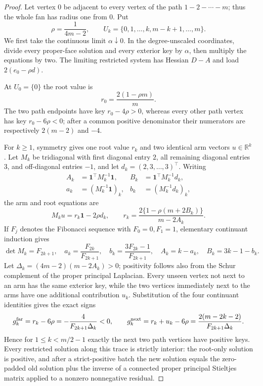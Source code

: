\begin{proof}
Let vertex $0$ be adjacent to every vertex of the path
$1-2-\cdots-m$; thus the whole fan has radius one from $0$.  Put
\begin{equation*}
 \rho=\frac1{4m-2},\qquad
 U_k=\{0,1,\ldots,k,m-k+1,\ldots,m\}.
\end{equation*}
We first take the continuous limit $\alpha\downarrow0$.  In the
degree-unscaled coordinates, divide every proper-face solution and every
exterior key by $\alpha$, then multiply the equations by two.  The limiting
restricted system has Hessian $D-A$ and load $2(e_0-\rho d)$.

At $U_0=\{0\}$ the root value is
\begin{equation*}
 r_0=\frac{2(1-\rho m)}m.
\end{equation*}
The two path endpoints have key $r_0-4\rho>0$, whereas every other
path vertex has key $r_0-6\rho<0$; after a common positive denominator their
numerators are respectively $2(m-2)$ and $-4$.

For $k\geq1$, symmetry gives one root value $r_k$ and two identical arm
vectors $u\in\mathbb R^k$.  Let $M_k$ be tridiagonal with first diagonal
entry $2$, all remaining diagonal entries $3$, and off-diagonal entries
$-1$, and let $d_k=(2,3,\ldots,3)^\top$.  Writing
\begin{align*}
 A_k&=\mathbf1^\top M_k^{-1}\mathbf1,&
 B_k&=\mathbf1^\top M_k^{-1}d_k,\\
 a_k&=(M_k^{-1}\mathbf1)_k,&
 b_k&=(M_k^{-1}d_k)_k,
\end{align*}
the arm and root equations are
\begin{equation*}
 M_ku=r_k\mathbf1-2\rho d_k,\qquad
 r_k=\frac{2\{1-\rho(m+2B_k)\}}{m-2A_k}.
\end{equation*}
If $F_j$ denotes the Fibonacci sequence with $F_0=0,F_1=1$, elementary
continuant induction gives
\begin{equation*}
 \det M_k=F_{2k+1},\quad
 a_k=\frac{F_{2k}}{F_{2k+1}},\quad
 b_k=\frac{3F_{2k}-1}{F_{2k+1}},\quad
 A_k=k-a_k,\quad B_k=3k-1-b_k.
\end{equation*}
Let
$\Delta_k=(4m-2)(m-2A_k)>0$; positivity follows also from the Schur
complement of the proper principal Laplacian.  Every unseen vertex not next
to an arm has the same exterior key, while the two vertices immediately next
to the arms have one additional contribution $u_k$.  Substitution of the
four continuant identities gives the exact signs
\begin{equation}
 g_k^{\rm far}=r_k-6\rho
   =-\frac{4}{F_{2k+1}\Delta_k}<0,\qquad
 g_k^{\rm next}=r_k+u_k-6\rho
   =\frac{2(m-2k-2)}{F_{2k+1}\Delta_k}.
 \label{eq:aesp-cd-fan-linear-batch-keys}
\end{equation}
Hence for $1\leq k<m/2-1$ exactly the next two path vertices have
positive keys.  Every restricted solution along this trace is strictly
interior: the root-only solution is positive, and after a strict-positive
batch the new solution equals the zero-padded old solution plus the inverse
of a connected proper principal Stieltjes matrix applied to a nonzero
nonnegative residual.


\end{proof}

